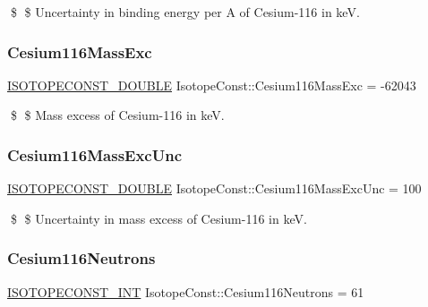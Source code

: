 \$ \$ Uncertainty in binding energy per A of Cesium-\/116 in keV. \mbox{\label{group___isotope_const-_cesium-_cs116_ga4071dd524dd568787c617a063fa92bf8}} 
\subsubsection{\texorpdfstring{Cesium116\+Mass\+Exc}{Cesium116MassExc}}
{\footnotesize\ttfamily \mbox{\hyperlink{group___isotope_const-_macros_ga8f45a7272ce02c0b4c65c44636ed719a}{I\+S\+O\+T\+O\+P\+E\+C\+O\+N\+S\+T\+\_\+\+D\+O\+U\+B\+LE}} Isotope\+Const\+::\+Cesium116\+Mass\+Exc = -\/62043}

\$ \$ Mass excess of Cesium-\/116 in keV. \mbox{\label{group___isotope_const-_cesium-_cs116_ga82c8bc9dbb6d74ce92609f2f53aeedb2}} 
\subsubsection{\texorpdfstring{Cesium116\+Mass\+Exc\+Unc}{Cesium116MassExcUnc}}
{\footnotesize\ttfamily \mbox{\hyperlink{group___isotope_const-_macros_ga8f45a7272ce02c0b4c65c44636ed719a}{I\+S\+O\+T\+O\+P\+E\+C\+O\+N\+S\+T\+\_\+\+D\+O\+U\+B\+LE}} Isotope\+Const\+::\+Cesium116\+Mass\+Exc\+Unc = 100}

\$ \$ Uncertainty in mass excess of Cesium-\/116 in keV. \mbox{\label{group___isotope_const-_cesium-_cs116_ga83307f00494859e53e7b284245c124a0}} 
\subsubsection{\texorpdfstring{Cesium116\+Neutrons}{Cesium116Neutrons}}
{\footnotesize\ttfamily \mbox{\hyperlink{group___isotope_const-_macros_ga5f18360b3e99483a35c32d789e62621c}{I\+S\+O\+T\+O\+P\+E\+C\+O\+N\+S\+T\+\_\+\+I\+NT}} Isotope\+Const\+::\+Cesium116\+Neutrons = 61}

